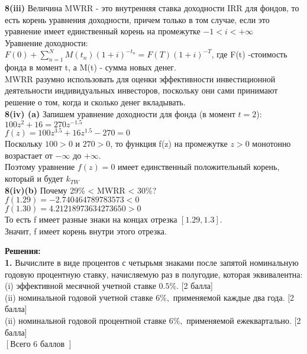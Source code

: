 \documentclass{article}
\begin{document}
{\bf \large  8(iii)} Величина MWRR  -  это внутренняя ставка доходности IRR для фондов, 
то есть корень уравнения доходности, причем только в том случае, если это уравнение имеет единственный корень на промежутке  $ -1 < i < +\infty$\\

Уравнение доходности:\\
$F(0) + \sum\limits_{n=1}^{N} M(t_n) (1+i)^{-t_n} = F(T)(1+i)^{-T}$, где F(t) -стоимость фонда в момент t, а M(t) - сумма новых денег.\\

MWRR разумно использовать для оценки эффективности  инвестиционной деятельности индивидуальных инвесторов, поскольку они сами принимают решение о том, когда и сколько денег вкладывать.\\

{\bf \large  8(iv) (a) } Запишем уравнение доходности для фонда (в момент $t=2$):\\

$100z^2 + 16 = 270z^{-1.5}$\\

$f(z)= 100z^{3.5} + 16z^{1.5} - 270 = 0$\\

Поскольку $100>0$ и $270>0$, то функция f(z) на промежутке $z>0$ монотонно возрастает от $-\infty$ до $+\infty$.\\

Поэтому уравнение $f(z)=0$ имеет единственный положительный корень, который и будет $k_{TW}$\\

{\bf   8(iv)(b)} Почему 29\% < MWRR < 30\%?\\

$f(1.29) = -2.740464789783573 < 0$\\
$f(1.30) = 4.21218973634273650 > 0$\\

То есть f имеет разные знаки на концах отрезка $\left[ 1.29, 1.3\right]$. \\
Значит,  f  имеет корень внутри этого отрезка.



{\large \bf Решения:}\\




{\bf \large1.} Вычислите в виде процентов с четырьмя знаками после запятой номинальную
 годовую процентную ставку, начисляемую раз в полугодие, которая эквивалентна:\\
 (i) эффективной месячной учетной ставке $0.5\%.$  [2 балла]\\
 (ii) номинальной годовой учетной ставке $6\%,$ применяемой каждые два года.  [2 балла]\\
 (ii) номинальной годовой процентной ставке $6\%,$ применяемой ежеквартально.  [2 балла]\\
$\left[\right. $Всего 6 баллов $\left.\right]$\\
\end{document}

